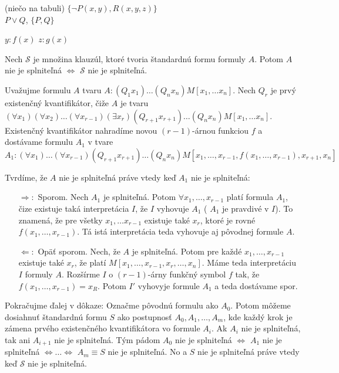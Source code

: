 \par (niečo na tabuli)
$\{\neg P(x,y), R(x,y,z) \}$ \\
$P \lor Q$, $\{P, Q\}$

$y: f(x)$
$z: g(x)$

\stopFIXME

\begin{veta}
    Nech $\mathscr{S}$ je množina klauzúl, ktoré tvoria štandardnú
    formu formuly $A$. Potom $A$ nie je splniteľná $\iff$ $\mathscr{S}$
    nie je splniteľná.
\end{veta}

\begin{dokaz}
    Uvažujme formulu $A$ tvaru $A: (Q_1 x_1) \dots (Q_n x_n) M[x_1, \dots x_n]$.
    Nech $Q_r$ je prvý existenčný kvantifikátor, čiže $A$ je tvaru
    $(\forall x_1) (\forall x_2) \dots (\forall x_{r-1}) (\exists x_r)
     (Q_{r+1} x_{r+1}) \dots (Q_n x_n) M[x_1, \dots x_n]$.
    Existenčný kvantifikátor nahradíme novou $(r-1)$-árnou funkciou $f$ a
    dostávame formulu $A_1$ v tvare
    \begin{equation*}
        A_1: (\forall x_1) \dots (\forall x_{r-1}) (Q_{r+1} x_{r+1})  \dots (Q_n x_n)
                M[x_1, \dots, x_{r-1}, f(x_1, \dots, x_{r-1}), x_{r+1}, x_n]
    \end{equation*}

    \noindent Tvrdíme, že $A$ nie je splniteľná práve vtedy keď $A_1$ nie je splniteľná:
    \begin{itemize}
    \item[$\Rightarrow:$] Sporom. Nech $A_1$ je splniteľná.
        Potom $\forall x_1,\dots,x_{r-1}$ platí formula $A_1$, čize
        existuje taká interpretácia $I$, že $I$ vyhovuje $A_1$ ( $A_1$ je pravdivé v $I$).
        To znamená, že pre všetky $x_1 , \dots x_{r-1}$ existuje také $x_r$,
        ktoré je rovné $f(x_1, \dots, x_{r-1})$.
        Tá istá interpretácia teda vyhovuje aj pôvodnej formule $A$.

    \item[$\Leftarrow:$] Opäť sporom. Nech, že $A$ je splniteľná.
        Potom pre každé $x_1, \dots, x_{r-1}$ existuje také $x_r$, že platí 
        $M[x_1, \dots, x_{r-1}, x_r, \dots, x_n]$.
        Máme teda interpretáciu $I$ formuly $A$. Rozšírme $I$ o $(r-1)$-árny funkčný 
        symbol $f$ tak, že $f(x_1, \dots, x_{r-1}) = x_R$. Potom $I'$
        vyhovyje formule $A_1$ a teda dostávame spor.
    \end{itemize}

    \noindent Pokračujme ďalej v dôkaze:
    Označme pôvodnú formulu ako $A_0$. Potom môžeme dosiahnuť štandardnú formu
    $S$ ako postupnosť $A_0, A_1, \dots, A_m$, kde každý krok je zámena prvého
    existenčného kvantifikátora vo formule $A_i$.
    Ak $A_i$ nie je splniteľná, tak ani $A_{i+1}$ nie je splniteľná.
    Tým pádom $A_0$ nie je splniteľná $\iff$ $A_1$ nie je splniteľná $\iff
    \dots \iff$ $A_m\equiv S$ nie je splniteľná.
    No a $S$ nie je splniteľná práve vtedy keď $\mathscr{S}$ nie je
    splniteľná.
\end{dokaz}

